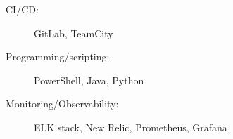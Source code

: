\begin{minipage}[t]{.3\linewidth}
  \begin{description}
    \item[CI/CD:] GitLab, TeamCity
  \end{description}
\end{minipage}

\begin{minipage}[t]{.3\linewidth}
  \begin{description}
    \item[Programming/scripting:] PowerShell, Java, Python
  \end{description}
\end{minipage}

\begin{minipage}[t]{.3\linewidth}
  \begin{description}
    \item[Monitoring/Observability:] ELK stack, New Relic, Prometheus, Grafana
  \end{description}
\end{minipage}
